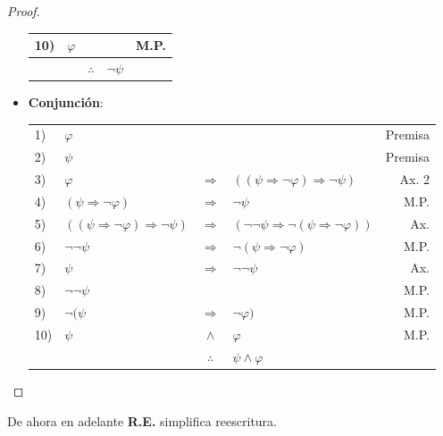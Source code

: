 \documentclass[12pt]{report}
\theoremstyle{largebreak}
\begin{document}
\begin{proof}
\begin{itemize}
\begin{center}
\begin{tabular}{l l c l r}
                    10) & $\varphi$ &  &  &  M.P. \\
                    \hline
                    & & $\therefore$ & $\neg\psi$ & \\
                \end{tabular}
            \end{center}
            \item \textbf{Conjunción}:
            \begin{center}
                \begin{tabular}{l l c l r}
                    1) & $\varphi$ &  &  & Premisa \\
                    2) & $\psi$ &  &  & Premisa \\
                    3) & $\varphi$ & $\Rightarrow$ & $((\psi\Rightarrow\neg\varphi)\Rightarrow\neg\psi)$ & Ax. 2 \\
                    4) & $(\psi\Rightarrow\neg\varphi)$ & $\Rightarrow$ & $\neg\psi$ & M.P. \\
                    5) & $((\psi\Rightarrow\neg\varphi)\Rightarrow\neg\psi)$ & $\Rightarrow$ & $(\neg\neg\psi\Rightarrow\neg(\psi\Rightarrow\neg\varphi))$ & Ax.  \\
                    6) & $\neg\neg\psi$ & $\Rightarrow$ & $\neg(\psi\Rightarrow\neg\varphi)$ & M.P.\\
                    7) & $\psi$ & $\Rightarrow$ & $\neg\neg\psi$ & Ax.\\
                    8) & $\neg\neg\psi$ &  &  & M.P.\\
                    9) & $\neg(\psi$ & $\Rightarrow$ & $\neg\varphi)$ & M.P.\\
                    10) & $\psi$ & $\land$ & $\varphi$ & M.P.\\
                    \hline
                    & & $\therefore$ & $\psi\land\varphi$ & \\
                \end{tabular}
            \end{center}
        \end{itemize}
    \end{proof}

    \begin{obs}
        De ahora en adelante \textbf{R.E.} simplifica reescritura.
    \end{obs}
\end{document}
